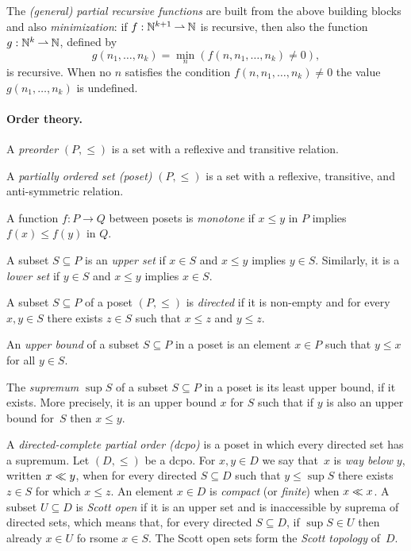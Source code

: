 The \emph{(general) partial recursive functions} are built from the
above building blocks and also \emph{minimization}: if $f :
\mathbb{N}^{k+1} \mathbin{\rightharpoonup} \mathbb{N}$ is recursive, then also the function $g : \mathbb{N}^k
\mathbin{\rightharpoonup} \mathbb{N}$, defined by
%
\begin{equation*}
  g(n_1, \ldots, n_k) = \min_n (f(n, n_1, \ldots, n_k) \neq 0),
\end{equation*}
%
is recursive. When no $n$ satisfies the condition $f(n, n_1, \ldots,
n_k) \neq 0$ the value $g(n_1, \ldots, n_k)$ is undefined.


\paragraph{Order theory.}

A \emph{preorder} $(P, {\leq})$ is a set with a reflexive and
transitive relation.

A \emph{partially ordered set (poset)} $(P, {\leq})$ is a set with a
reflexive, transitive, and anti-symmetric relation.

A function $f : P \to Q$ between posets is \emph{monotone} if $x \leq
y$ in $P$ implies $f(x) \leq f(y)$ in $Q$.

A subset $S \subseteq P$ is an \emph{upper set} if $x \in S$ and $x
\leq y$ implies $y \in S$. Similarly, it is a \emph{lower set} if $y
\in S$ and $x \leq y$ implies $x \in S$.

A subset $S \subseteq P$ of a poset $(P, {\leq})$ is \emph{directed}
if it is non-empty and for every $x, y \in S$ there exists $z \in S$
such that $x \leq z$ and $y \leq z$.

An \emph{upper bound} of a subset $S \subseteq P$ in a poset is an
element $x \in P$ such that $y \leq x$ for all $y \in S$.

The \emph{supremum} $\sup S$ of a subset $S \subseteq P$ in a poset is
its least upper bound, if it exists. More precisely, it is an upper
bound $x$ for $S$ such that if $y$ is also an upper bound for~$S$ then
$x \leq y$.

A \emph{directed-complete partial order (dcpo)} is a poset in which
every directed set has a supremum. Let $(D, {\leq})$ be a dcpo. For
$x, y \in D$ we say that~$x$ is \emph{way below} $y$, written $x \ll
y$, when for every directed $S \subseteq D$ such that $y \leq \sup S$
there exists $z \in S$ for which $x \leq z$. An element $x \in D$ is
\emph{compact} (or \emph{finite}) when $x \ll x$. A subset $U
\subseteq D$ is \emph{Scott open} if it is an upper set and is
inaccessible by suprema of directed sets, which means that, for every
directed $S \subseteq D$, if $\sup S \in U$ then already $x \in U$ fo
rsome $x \in S$. The Scott open sets form the \emph{Scott topology}
of~$D$.

